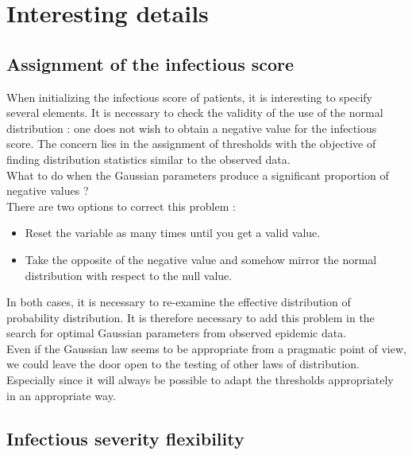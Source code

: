 \newpage

\section{Interesting details}

\subsection{Assignment of the infectious score}

When initializing the infectious score of patients, it is interesting to specify several elements. It is necessary to check the validity of the use of the normal distribution : one does not wish to obtain a negative value for the infectious score. The concern lies in the assignment of thresholds with the objective of finding distribution statistics similar to the observed data.\\

What to do when the Gaussian parameters produce a significant proportion of negative values ?\\

There are two options to correct this problem :\\

\begin{itemize}
\item Reset the variable as many times until you get a valid value.
\item Take the opposite of the negative value and somehow mirror the normal distribution with respect to the null value.\\
\end{itemize}

In both cases, it is necessary to re-examine the effective distribution of probability distribution. It is therefore necessary to add this problem in the search for optimal Gaussian parameters from observed epidemic data.\\

Even if the Gaussian law seems to be appropriate from a pragmatic point of view, we could leave the door open to the testing of other laws of distribution. Especially since it will always be possible to adapt the thresholds appropriately in an appropriate way.\\

\subsection{Infectious severity flexibility}

